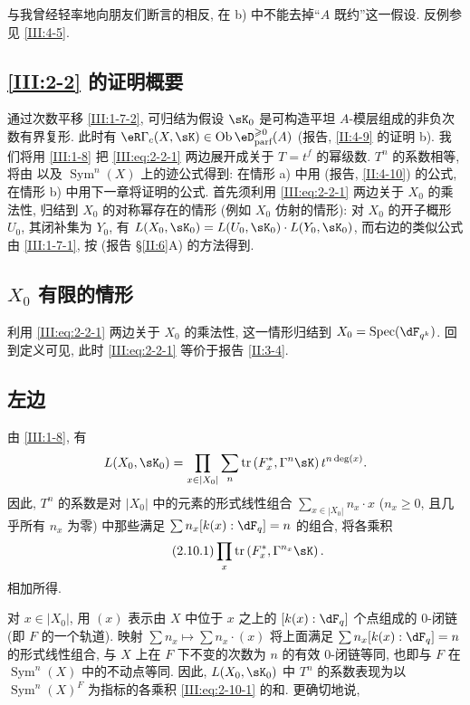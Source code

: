 与我曾经轻率地向朋友们断言的相反, 在 b) 中不能去掉“$A$ 既约”这一假设. 反例参见 \ref{III:4-5}.

\subsection{\ref{III:2-2} 的证明概要}\label{III:2-8}

通过次数平移 \ref{III:1-7-2}, 可归结为假设 $\sK_0$ 是可构造平坦 $A$-模层组成的非负次数有界复形. 此时有 $\eR\Gamma_c(X,\sK)\in \ob\eD_\text{parf}^{\geqslant 0}(A)$ (报告, \ref{II:4-9} 的证明 b). 我们将用 \ref{III:1-8} 把 \eqref{III:eq:2-2-1} 两边展开成关于 $T=t^f$ 的幂级数. $T^n$ 的系数相等, 将由 \cite[XVII 5.5.21]{sga4} 以及 $\operatorname{Sym}^n(X)$ 上的迹公式得到: 在情形 a) 中用 (报告, \ref{II:4-10}) 的公式, 在情形 b) 中用下一章将证明的公式. 首先须利用 \eqref{III:eq:2-2-1} 两边关于 $X_0$ 的乘法性, 归结到 $X_0$ 的对称幂存在的情形 (例如 $X_0$ 仿射的情形): 对 $X_0$ 的开子概形 $U_0$, 其闭补集为 $Y_0$, 有 $L(X_0,\sK_0)=L(U_0,\sK_0)\cdot L(Y_0,\sK_0)$, 而右边的类似公式由 \ref{III:1-7-1}, 按 (报告 \S\ref{II:6}A) 的方法得到.

\subsection{$X_0$ 有限的情形}\label{III:2-9}

利用 \eqref{III:eq:2-2-1} 两边关于 $X_0$ 的乘法性, 这一情形归结到 $X_0=\spec(\dF_{q^k})$. 回到定义可见, 此时 \eqref{III:eq:2-2-1} 等价于报告 \ref{II:3-4}.

\subsection{左边}\label{III:2-10}

由 \ref{III:1-8}, 有
\[
  L(X_0,\sK_0) = \prod_{x\in |X_0|} \sum_n \tr\left(F_x^*,\Gamma^n\sK\right) t^{n\deg(x)} \text{.}
\]
因此, $T^n$ 的系数是对 $|X_0|$ 中的元素的形式线性组合 $\sum_{x\in |X_0|} n_x\cdot x$ ($n_x\geqslant 0$, 且几乎所有 $n_x$ 为零) 中那些满足 $\sum n_x [k(x):\dF_q] = n$ 的组合, 将各乘积
\begin{equation*}\tag{2.10.1}\label{III:eq:2-10-1}
  \prod_x \tr\left(F_x^*,\Gamma^{n_x} \sK\right) \text{.}
\end{equation*}
相加所得.

对 $x\in |X_0|$, 用 $(x)$ 表示由 $X$ 中位于 $x$ 之上的 $[k(x):\dF_q]$ 个点组成的 $0$-闭链 (即 $F$ 的一个轨道). 映射 $\sum n_x\mapsto \sum n_x\cdot (x)$ 将上面满足 $\sum n_x [k(x):\dF_q]=n$ 的形式线性组合, 与 $X$ 上在 $F$ 下不变的次数为 $n$ 的有效 $0$-闭链等同, 也即与 $F$ 在 $\operatorname{Sym}^n(X)$ 中的不动点等同. 因此, $L(X_0,\sK_0)$ 中 $T^n$ 的系数表现为以 $\operatorname{Sym}^n(X)^F$ 为指标的各乘积 \eqref{III:eq:2-10-1} 的和. 更确切地说,


